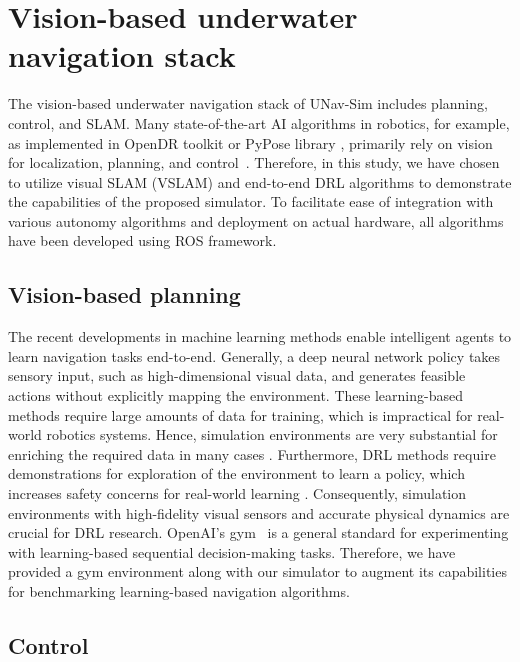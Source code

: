 \section{Vision-based underwater navigation stack}\label{sec:stack}
The vision-based underwater navigation stack of UNav-Sim includes planning, control, and \ac{SLAM}. Many state-of-the-art \ac{AI} algorithms in robotics, for example, as implemented in OpenDR toolkit \cite{opendr} or PyPose library \cite{pypose}, primarily rely on vision for localization, planning, and control~\cite{huy}. Therefore, in this study, we have chosen to utilize visual SLAM (VSLAM) and end-to-end \ac{DRL} algorithms to demonstrate the capabilities of the proposed simulator. To facilitate ease of integration with various autonomy algorithms and deployment on actual hardware, all algorithms have been developed using \ac{ROS} framework.




\subsection{Vision-based planning}
\label{sec:stack:planning}


The recent developments in machine learning methods enable intelligent agents to learn navigation tasks end-to-end. Generally, a deep neural network policy takes sensory input, such as high-dimensional visual data, and generates feasible actions without explicitly mapping the environment. These learning-based methods require large amounts of data for training, which is impractical for real-world robotics systems. Hence, simulation environments are very substantial for enriching the required data in many cases \cite{loquercio2021learning}.
Furthermore, \ac{DRL} methods require demonstrations for exploration of the environment to learn a policy, which increases safety concerns for real-world learning \cite{halil}. 
Consequently, simulation environments with high-fidelity visual sensors and accurate physical dynamics are crucial for DRL research. OpenAI's gym~\cite{simulator:openai_gym} is a general standard for experimenting with learning-based sequential decision-making tasks.
Therefore, we have provided a gym environment along with our simulator to augment its capabilities for benchmarking learning-based navigation algorithms.

\subsection{Control}
\label{sec:stack:control}

